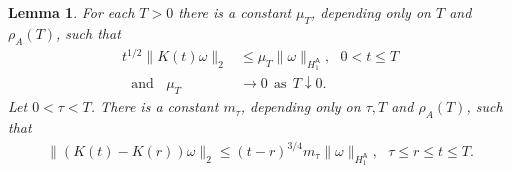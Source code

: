 \documentclass[12pt]{article}
\newtheorem{lemma}[theorem]{Lemma}
\def \As{\mathsf{A}}
\def \w{\omega}
\numberwithin{equation}{section}
\begin{document}
\begin{lemma}\label{lemests1}  
For each $T > 0$ there is a constant $\mu_T$, depending only on $T$ and $\rho_A(T)$,     
 such that
\begin{align}
t^{1/2} \|K(t) \w\|_2 &\le \mu_T \|\w\|_{H_1^\As}, \ \ \ 0 <t \le T      \label{eie5}\\
\ \ \  \text{and}\ \ \  \ \mu_T &\rightarrow 0\ \ \text{as}\ \ T \downarrow 0. \label{eie6}
\end{align}
Let $0 < \tau <T$. There is a constant $m_\tau$, depending only on $\tau, T$ and $\rho_A(T)$,  such that
\begin{align}
\|(K(t) - K(r))\w\|_2 \le (t-r)^{3/4} 
    m_\tau  \|\w\|_{H_1^\As},\ \ \ \tau\le r \le t \le T.      \label{eie7}
\end{align}

\end{lemma}
\end{document}
